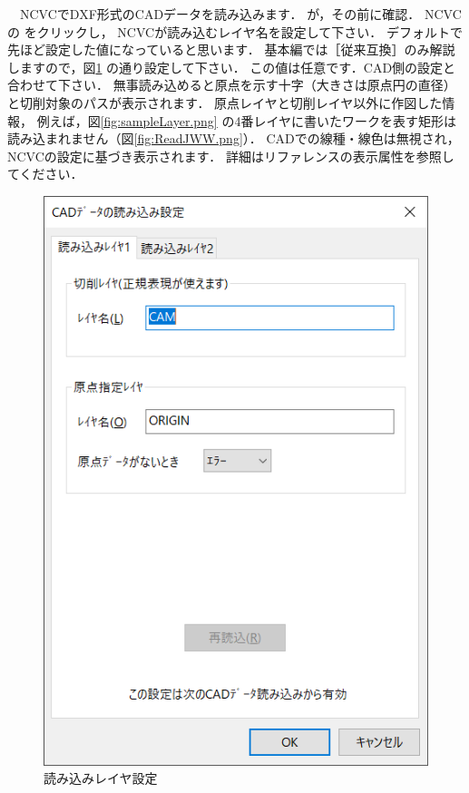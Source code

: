 \begin{minipage}[t]{0.5\textwidth}
　NCVCでDXF形式のCADデータを読み込みます．
が，その前に確認．
NCVCの  をクリックし，
NCVCが読み込むレイヤ名を設定して下さい．
デフォルトで先ほど設定した値になっていると思います．
基本編では［従来互換］のみ解説しますので，図\ref{fig:ReadSetup.png} の通り設定して下さい．
この値は任意です．CAD側の設定と合わせて下さい．
無事読み込めると原点を示す十字（大きさは原点円の直径）と切削対象のパスが表示されます．
原点レイヤと切削レイヤ以外に作図した情報，
例えば，図\ref{fig:sampleLayer.png} の4番レイヤに書いたワークを表す矩形は読み込まれません（図\ref{fig:ReadJWW.png}）．
CADでの線種・線色は無視され，NCVCの設定に基づき表示されます．
詳細はリファレンスの表示属性を参照してください．
\end{minipage}
\begin{minipage}[t]{0.5\textwidth}
\vspace*{-2zh}
\begin{figure}[H]
\centering
\includegraphics[scale=0.7]{No2/fig/ReadSetup.png}
\caption{読み込みレイヤ設定}
\label{fig:ReadSetup.png}
\end{figure}
\end{minipage}

